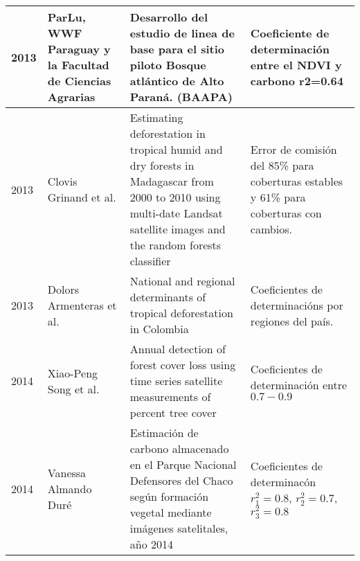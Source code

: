 \begin{longtable}{|p{3cm}|p{3cm}|p{3cm}|p{3cm}|}
				2013          & ParLu, WWF Paraguay y la Facultad de Ciencias Agrarias & Desarrollo del estudio de linea de base para el sitio 	piloto Bosque atl\'antico de Alto Paran\'a. (BAAPA)                                                               & Coeficiente de determinaci\'on entre el NDVI y carbono r2=0.64                              \\ \hline
				
				2013          & Clovis Grinand et al.                                  & Estimating deforestation in tropical humid and dry forests in Madagascar from 2000 to 2010 using multi-date Landsat satellite images and the random forests classifier & Error de comisi\'on del 85\% para coberturas estables y 61\% para coberturas con cambios. \\ \hline
				2013          & Dolors Armenteras et al.                               & National and regional determinants of tropical deforestation in Colombia                                                                                               & Coeficientes de determinaci\'ons por regiones del pa\'is.                                 \\ \hline
				2014          & Xiao-Peng Song et al.                                  & Annual detection of forest cover loss using time series satellite measurements of percent tree cover                                                                   & Coeficientes de determinaci\'on entre $ 0.7 - 0.9 $                                       \\ \hline
				2014           & Vanessa Almando Dur\'e                                 & Estimaci\'on de carbono almacenado en el Parque Nacional Defensores del Chaco seg\'un formaci\'on vegetal mediante im\'agenes satelitales, a\~{n}o 2014              & Coeficientes de determinac\'on $ r_{1}^{2}=0.8$, $ r_{2}^{2}=0.7 $, $r_{3}^{2}=0.8 $      \\ \hline
				

\end{longtable}
